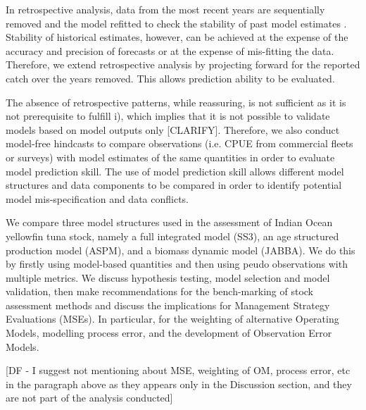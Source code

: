 In retrospective analysis, data from the most recent years are sequentially removed and the model refitted to check the stability of past model estimates \parencite{hurtado2014looking}. Stability of historical estimates, however, can be achieved at the expense of the accuracy and precision of forecasts or at the expense of mis-fitting the data. Therefore, we extend retrospective analysis by projecting forward for the reported catch over the years removed. This allows prediction ability to be evaluated. 

The absence of retrospective patterns, while reassuring, is not sufficient as it is not prerequisite to fulfill i), which implies that it is not possible to validate models based on model outputs only [CLARIFY]. Therefore, we also conduct model-free hindcasts to compare observations (i.e. CPUE from commercial fleets or surveys) with model estimates of the same quantities in order to evaluate model prediction skill. The use of model prediction skill allows different model structures and data components to be compared in order to identify potential model mis-specification and data conflicts. 

We compare three model structures used in the assessment of Indian Ocean yellowfin tuna stock, namely a full integrated model (SS3), an age structured production model (ASPM), and a biomass dynamic model (JABBA). We do this by firstly using model-based quantities and then using peudo observations with multiple metrics. We discuss hypothesis testing, model selection and model validation, then make recommendations for the bench-marking of stock assessment methods and discuss the implications for Management Strategy Evaluations (MSEs). In particular, for the weighting of alternative Operating Models, modelling process error, and the development of Observation Error Models.   

[DF - I suggest not mentioning about MSE, weighting of OM, process error, etc in the paragraph above as they appears only in the Discussion section, and they are not part of the analysis conducted]
